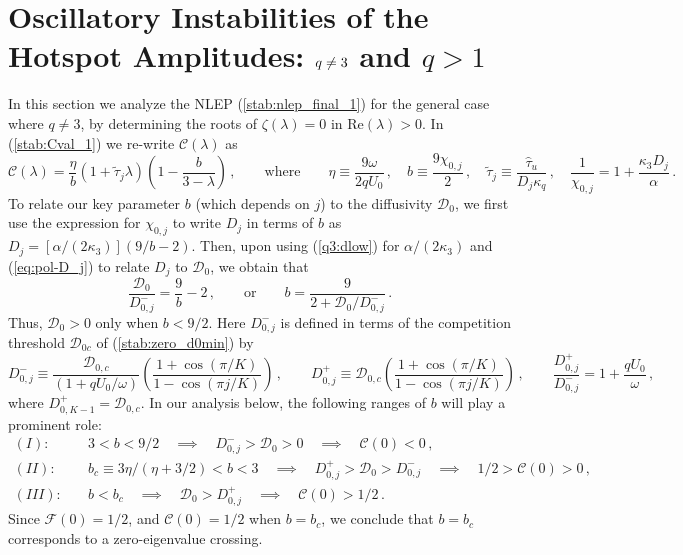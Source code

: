 \documentclass{article}%
\newcommand{\bsub}{\begin{subequations}}
\newcommand{\esub}{\end{subequations}$\!$}
\newcommand{\dzjp}{D^{+}_{0,j}}
\newcommand{\dzjm}{D^{-}_{0,j}}
\begin{document}
\setcounter{equation}{0}
\setcounter{section}{5}
\section{Oscillatory Instabilities of the Hotspot Amplitudes: $q\protect\neq3$
and $q>1$}\label{sec:stab_qn3}

In this section we analyze the NLEP (\ref{stab:nlep_final_1}) for the
general case where $q\neq 3$, by determining the roots of
$\zeta(\lambda)=0$ in $\mbox{Re}(\lambda)>0$. In 
(\ref{stab:Cval_1}) we re-write ${\mathcal C}(\lambda)$ as
\begin{equation}\label{genq:C}
\mathcal{C}(\lambda)=\frac{\eta}{b}\left(1+\tilde{\tau}_{j}\lambda\right)
\left(1-\frac{b}{3-\lambda}\right)\,, \qquad\mbox{where} \qquad
\eta \equiv \frac{9\omega}{2qU_0}  \,, \quad 
b\equiv \frac{9\chi_{0,j}}{2}\,, \quad
\tilde{\tau}_{j} \equiv \frac{\hat{\tau}_{u}}{D_j \kappa_q} \,, \quad
 \frac{1}{\chi_{0,j}} = 1 + \frac{\kappa_3 D_j}{\alpha} \,.
\end{equation}
To relate our key parameter $b$ (which depends on $j$) to the
diffusivity ${\mathcal D}_0$, we first use the expression for
$\chi_{0,j}$ to write $D_j$ in terms of $b$ as
$D_{j}=\left[{\alpha/(2\kappa_3)}\right] \left({9/b}-2\right)$. Then,
upon using (\ref{q3:dlow}) for $\alpha/(2\kappa_3)$ and
(\ref{eq:pol-D_j}) to relate $D_j$ to ${\mathcal D}_0$, we obtain that
\begin{equation}\label{param:b}
      \frac{{\mathcal D}_0}{D^{-}_{0,j}}= \frac{9}{b}-2 \,, \qquad
  \mbox{or} \qquad   b = \frac{9}{2 + {\mathcal D}_0/D^{-}_{0,j}}  \,.
\end{equation}
Thus, ${\mathcal D}_0>0$ only when $b<{9/2}$.  Here $\dzjm$ is
defined in terms of the competition threshold ${\mathcal D}_{0c}$ of
(\ref{stab:zero_d0min}) by
\begin{equation}\label{param:dzjm}
   \dzjm \equiv \frac{{\mathcal D}_{0,c}}{\left(1+{q U_0/\omega}\right)}
  \left( \frac{1+\cos\left({\pi/K}\right)}
  {1-\cos\left({\pi j /K}\right)}\right) \,, \qquad
  \dzjp \equiv {\mathcal D}_{0,c} \left( \frac{1+\cos\left({\pi/K}\right)}
  {1-\cos\left({\pi j /K}\right)}\right) \,, \qquad
  \frac{\dzjp}{\dzjm}=1+ \frac{qU_0}{\omega} \,,
\end{equation}
where $D^{+}_{0,K-1}={\mathcal D}_{0,c}$.  In our analysis below, the
following ranges of $b$ will play a prominent role:
\bsub \label{genq:b_range}
\begin{align}
  (I):\quad  & 3<b<{9/2}  \quad \implies \quad \dzjm>{\mathcal D}_0>0 
   \quad \implies \quad {\mathcal C}(0)<0  \,, \\
  (II):\quad  & b_c\equiv {3\eta/\left(\eta + {3/2}\right)} < b< 3 \quad
    \implies \quad \dzjp >{\mathcal D}_0 >\dzjm \quad
    \implies \quad {1/2}>{\mathcal C}(0)>0 \,, \\
  (III):\quad  & b< b_c  \quad \implies \quad {\mathcal D}_0>\dzjp 
 \quad \implies \quad {\mathcal C}(0)>{1/2}\,.
\end{align}
\esub Since ${\mathcal F}(0)={1/2}$, and ${\mathcal C}(0)={1/2}$ when
$b=b_c$, we conclude that $b=b_c$ corresponds to a zero-eigenvalue
crossing.
\end{document}
